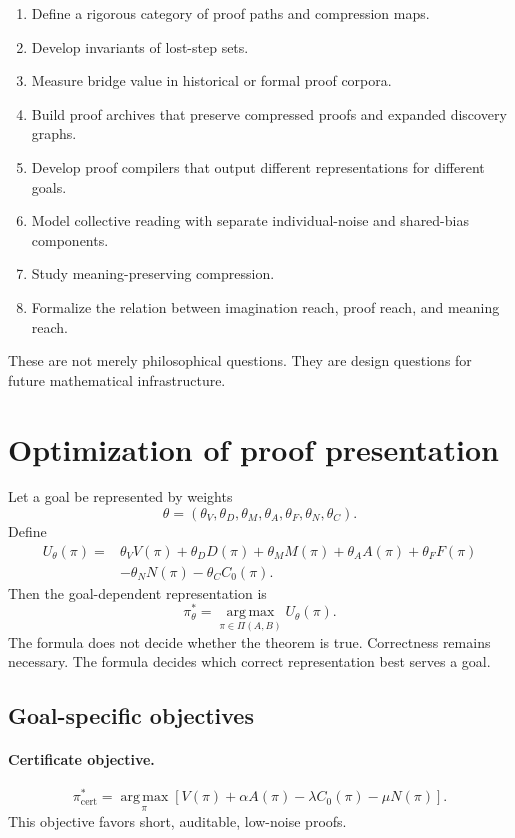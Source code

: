 \documentclass[11pt,oneside]{book}
\theoremstyle{remark}
\begin{document}
\begin{enumerate}[label=(\arabic*)]
\item Define a rigorous category of proof paths and compression maps.
\item Develop invariants of lost-step sets.
\item Measure bridge value in historical or formal proof corpora.
\item Build proof archives that preserve compressed proofs and expanded discovery graphs.
\item Develop proof compilers that output different representations for different goals.
\item Model collective reading with separate individual-noise and shared-bias components.
\item Study meaning-preserving compression.
\item Formalize the relation between imagination reach, proof reach, and meaning reach.
\end{enumerate}

These are not merely philosophical questions.  They are design questions for future mathematical infrastructure.

\section{Optimization of proof presentation}

Let a goal be represented by weights
\[
        \theta=(\theta_V,\theta_D,\theta_M,\theta_A,\theta_F,\theta_N,\theta_C).
\]
Define
\[
\begin{aligned}
        U_\theta(\pi)
        ={}&\theta_VV(\pi)+\theta_DD(\pi)+\theta_MM(\pi)
        +\theta_AA(\pi)+\theta_FF(\pi)\\
        &-\theta_NN(\pi)-\theta_CC_0(\pi).
\end{aligned}
\]
Then the goal-dependent representation is
\[
        \pi_\theta^*=
        \operatorname*{arg\,max}_{\pi\in\Pi(A,B)}U_\theta(\pi).
\]
The formula does not decide whether the theorem is true.  Correctness remains necessary.  The formula decides which correct representation best serves a goal.

\subsection{Goal-specific objectives}

\paragraph{Certificate objective.}
\[
        \pi^*_{\mathrm{cert}}
        =\operatorname*{arg\,max}_\pi
        \left[V(\pi)+\alpha A(\pi)-\lambda C_0(\pi)-\mu N(\pi)\right].
\]
This objective favors short, auditable, low-noise proofs.
\end{document}
